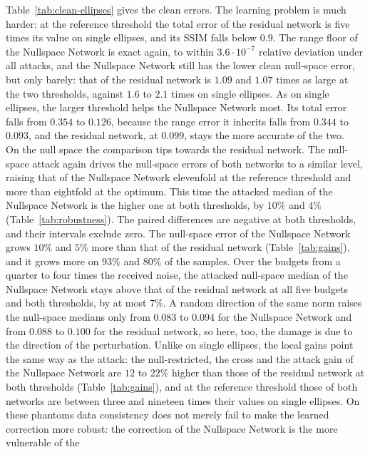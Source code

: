 \documentclass{article}
\numberwithin{equation}{section}
\begin{document}
Table~\ref{tab:clean-ellipses} gives the clean errors. The learning problem is much harder: at the
reference threshold the total error of the residual network is five times its value on single ellipses,
and its SSIM falls below $0.9$. The range floor of the Nullspace Network is exact again, to within
$3.6\cdot10^{-7}$ relative deviation under all attacks, and the Nullspace Network still has the lower clean
null-space error, but only barely: that of the residual network is $1.09$ and $1.07$ times as large at the
two thresholds, against $1.6$ to $2.1$ times on single ellipses. As on single ellipses, the larger
threshold helps the Nullspace Network most. Its total error falls from $0.354$ to $0.126$, because the
range error it inherits falls from $0.344$ to $0.093$, and the residual network, at $0.099$, stays the more
accurate of the two.\\
On the null space the comparison tips towards the residual network. The null-space attack again drives the
null-space errors of both networks to a similar level, raising that of the Nullspace Network elevenfold at
the reference threshold and more than eightfold at the optimum. This time the attacked median of the Nullspace Network
is the higher one at both thresholds, by $10\%$ and $4\%$ (Table~\ref{tab:robustness}). The paired
differences are negative at both thresholds, and their intervals exclude zero. The null-space error of the
Nullspace Network grows $10\%$ and $5\%$ more than that of the residual network (Table~\ref{tab:gains}), and
it grows more on $93\%$ and $80\%$ of the samples. Over the budgets from a quarter to four times the
received noise, the attacked null-space median of the Nullspace Network stays above that of the residual
network at all five budgets and both thresholds, by at most $7\%$. A random direction of the same norm
raises the null-space medians only from $0.083$ to $0.094$ for the Nullspace Network and from $0.088$ to
$0.100$ for the residual network, so here, too, the damage is due to the direction of the perturbation.
Unlike on single ellipses, the local gains point the same way as the attack: the null-restricted, the
cross and the attack gain of the Nullspace Network are $12$ to $22\%$ higher than those of the residual
network at both thresholds (Table~\ref{tab:gains}), and at the reference threshold those of both networks
are between three and nineteen times their values on single ellipses. On these phantoms data consistency does not merely fail to make the learned
correction more robust: the correction of the Nullspace Network is the more vulnerable of the
\end{document}
